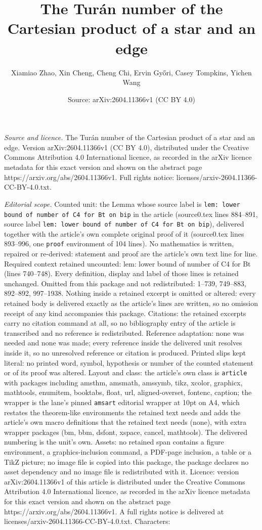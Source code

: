 \documentclass[10pt,a4paper]{amsart}
\title[The Tur\'{a}n number of the Cartesian product of a star and ]{The Tur\'{a}n number of the Cartesian product of a star and an edge}
\author{Xiamiao Zhao, Xin Cheng, Cheng Chi, Ervin Gy\H{o}ri, Casey Tompkins, Yichen Wang}
\date{Source: arXiv:2604.11366v1 (CC BY 4.0)}
\begin{document}
\maketitle

\noindent\emph{Source and licence.} The Tur\'{a}n number of the Cartesian product of a star and an edge. Version arXiv:2604.11366v1 (CC BY 4.0), distributed under the Creative Commons Attribution 4.0 International licence, as recorded in the arXiv licence metadata for this exact version and shown on the abstract page https://arxiv.org/abs/2604.11366v1. Full rights notice: licenses/arxiv-2604.11366-CC-BY-4.0.txt.\par\smallskip

\noindent\textit{Editorial scope.} Counted unit: the Lemma whose source label is \texttt{lem: lower bound of number of C4 for Bt on bip} in the article (source0.tex lines 884--891, source label \texttt{lem: lower bound of number of C4 for Bt on bip}), delivered together with the article's own complete original proof of it (source0.tex lines 893--996, one \texttt{proof} environment of 104 lines). No mathematics is written, repaired or re-derived: statement and proof are the article's own text line for line. Required context retained uncounted: lem: lower bound of number of C4 for Bt (lines 740--748). Every definition, display and label of those lines is retained unchanged. Omitted from this package and not redistributed: 1--739, 749--883, 892--892, 997--1938. Nothing inside a retained excerpt is omitted or altered: every retained body is delivered exactly as the article's lines are written, so no omission receipt of any kind accompanies this package. Citations: the retained excerpts carry no citation command at all, so no bibliography entry of the article is transcribed and no reference is redistributed. Reference adaptation: none was needed and none was made; every reference inside the delivered unit resolves inside it, so no unresolved reference or citation is produced. Printed slips kept literal: no printed word, symbol, hypothesis or number of the counted statement or of its proof was altered. Layout and class: the article's own class is \texttt{article} with packages including amsthm, amsmath, amssymb, tikz, xcolor, graphicx, mathtools, enumitem, booktabs, float, url, aligned-overset, fontenc, caption; the wrapper is the lane's pinned \texttt{amsart} editorial wrapper at 10pt on A4, which restates the theorem-like environments the retained text needs and adds the article's own macro definitions that the retained text needs (none), with extra wrapper packages (bm, bbm, dsfont, xspace, cancel, mathtools). The delivered numbering is the unit's own. Assets: no retained span contains a figure environment, a graphics-inclusion command, a PDF-page inclusion, a table or a TikZ picture; no image file is copied into this package, the package declares no asset dependency and no image file is redistributed with it. Licence: version arXiv:2604.11366v1 of this article is distributed under the Creative Commons Attribution 4.0 International licence, as recorded in the arXiv licence metadata for this exact version and shown on the abstract page https://arxiv.org/abs/2604.11366v1. A full rights notice is delivered at licenses/arxiv-2604.11366-CC-BY-4.0.txt. Characters: 
\end{document}
